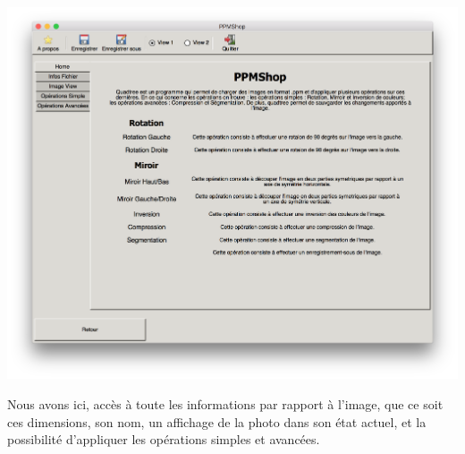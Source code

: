 \documentclass[12pt]{article}
\begin{document}
\begin{center}
\includegraphics[scale = 0.4]{homeView1}\\
\end{center}
Nous avons ici, accès à toute les informations par rapport à l'image, que ce soit ces dimensions, son nom, un affichage de la photo dans son état actuel, et la possibilité d'appliquer les opérations simples et avancées. 
\end{document}
